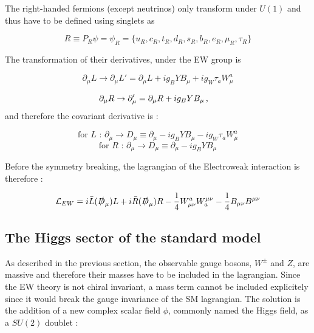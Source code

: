 The right-handed fermions (except neutrinos) only transform under $U(1)$ and thus have to be defined using singlets as

\begin{equation}
    R \equiv P_R \psi = \psi_R = \Bigg\{ u_R,c_R,t_R,d_R,s_R,b_R,e_R,\mu_R,\tau_R  \Bigg\}
\end{equation}

The transformation of their derivatives, under the EW group is

\begin{equation}
    \partial_{\mu}L \rightarrow \partial_{\mu}L' = \partial_{\mu}L + ig_B YB_{\mu} + ig_W \tau_a W_{\mu}^a
\end{equation}

\begin{equation}
    \partial_{\mu}R \rightarrow \partial_{\mu}' = \partial_{\mu}R + ig_B Y B_{\mu} \msep
\end{equation}
and therefore the covariant derivative is :

\begin{equation}
    \text{for $L$ :       } \partial_{\mu} \rightarrow D_{\mu} \equiv \partial_{\mu} - ig_B Y B_{\mu} - ig_W \tau_a W_{\mu}^a
\end{equation}
\begin{equation}
    \text{for $R$ :       } \partial_{\mu} \rightarrow D_{\mu} \equiv \partial_{\mu} - ig_B Y B_{\mu}
\end{equation}

Before the symmetry breaking, the lagrangian of the Electroweak interaction is therefore :

\begin{equation}
    \mathcal{L}_{EW} = i\Bar{L}(\slashed{D}_{\mu})L + i\Bar{R}(\slashed{D}_{\mu})R -\frac{1}{4}W_{\mu\nu}^a W^{\mu\nu}_a - \frac{1}{4}B_{\mu\nu}B^{\mu\nu}
\end{equation}

\subsection{The Higgs sector of the standard model}
\label{sec:SM_higgs}

As described in the previous section, the observable gauge bosons, $W^{\pm}$ and $Z$, are massive and therefore their masses have to be included in the lagrangian. Since the EW theory is not chiral invariant, a mass term cannot be included explicitely since it would break the gauge invariance of the SM lagrangian. The solution \cite{PhysRevLett.13.508} is the addition of a new complex scalar field $\phi$, commonly named the Higgs field, as a $SU(2)$ doublet :

